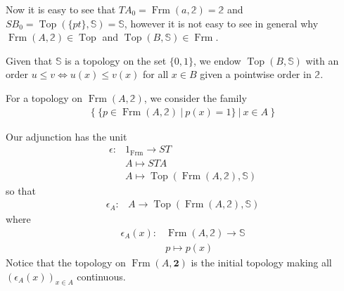 \documentclass[12pt,a4paper]{article}
\DeclareMathOperator{\Frm}{Frm}
\DeclareMathOperator{\Top}{Top}
\begin{document}
Now it is easy to see that $TA_0 = \Frm(a, \mathbb{2}) = \mathbb{2}$ and $SB_0 = \Top(\{pt\}, \mathbb{S}) = \mathbb{S}$, however it is not easy to see in general why $\Frm(A, \mathbb{2}) \in \Top$ and $\Top(B, \mathbb{S}) \in \Frm$.

Given that $\mathbb{S}$ is a topology on the set $\{0,1\}$, we endow $\Top(B, \mathbb{S})$ with an order $u \leq v \iff u(x) \leq v(x)$ for all $x \in B$ given a pointwise order in $\mathbb{2}$. 


For a topology on $\Frm(A, \mathbb{2})$, we consider the family \begin{align*}
	\{ \  \{p \in \Frm(A, \mathbb{2}) \   \lvert \  p(x) = 1 \} \ \lvert \ x \in A \ \} 
\end{align*} 

Our adjunction has the unit
\begin{align*}
	\epsilon:& 1_{\Frm} \to ST\\
	&A \mapsto STA\\
	&A \mapsto \Top(\Frm(A, \mathbb{2}), \mathbb{S})
\end{align*}
so that 
\begin{align*}
	\epsilon_A:& A \to \Top(\Frm(A, \mathbb{2}), \mathbb{S})
\end{align*}
where 
\begin{align*}
	\epsilon_A(x):& \Frm(A, \mathbb{2}) \to \mathbb{S}\\
	&p \mapsto p(x)
\end{align*}
Notice that the topology on $\Frm(A, \mathbf{2})$ is the initial topology making all $(\epsilon_A(x))_{x \in A}$ continuous.
\end{document}

